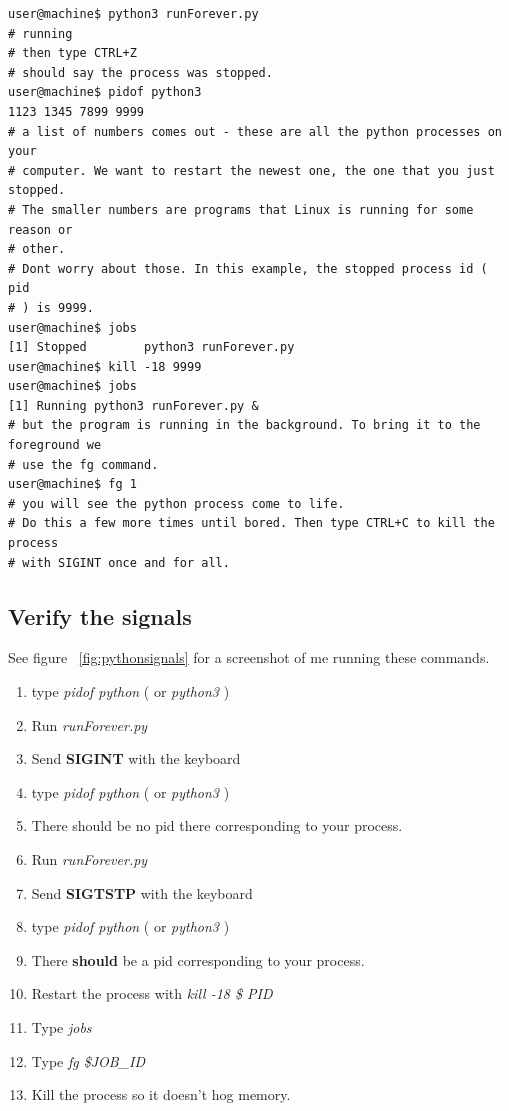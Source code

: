 \documentclass[8pt]{article}
\begin{document}
\begin{lstlisting}[style=term]
user@machine$ python3 runForever.py
# running 
# then type CTRL+Z
# should say the process was stopped.
user@machine$ pidof python3
1123 1345 7899 9999
# a list of numbers comes out - these are all the python processes on your
# computer. We want to restart the newest one, the one that you just stopped.
# The smaller numbers are programs that Linux is running for some reason or
# other.
# Dont worry about those. In this example, the stopped process id ( pid
# ) is 9999. 
user@machine$ jobs
[1] Stopped        python3 runForever.py
user@machine$ kill -18 9999
user@machine$ jobs
[1] Running python3 runForever.py &
# but the program is running in the background. To bring it to the foreground we
# use the fg command.
user@machine$ fg 1
# you will see the python process come to life.
# Do this a few more times until bored. Then type CTRL+C to kill the process
# with SIGINT once and for all.
\end{lstlisting}

\subsection{Verify the signals}
See figure ~\ref{fig:pythonsignals} for a screenshot of me running these
commands.

\begin{enumerate}
\item type \textit{pidof python} ( or \textit{python3} )
\item Run \textit{runForever.py}
\item Send \textbf{SIGINT} with the keyboard
\item type \textit{pidof python} ( or \textit{python3} )
\item There should be no pid there corresponding to your process.
\item Run \textit{runForever.py}
\item Send \textbf{SIGTSTP} with the keyboard
\item type \textit{pidof python} ( or \textit{python3} )
\item There \textbf{should} be a pid corresponding to your process.
\item Restart the process with \textit{kill -18 \$ PID}
\item Type \textit{jobs}
\item Type \textit{fg \$JOB\_ID}
\item Kill the process so it doesn't hog memory.
\end{enumerate}
\end{document}
